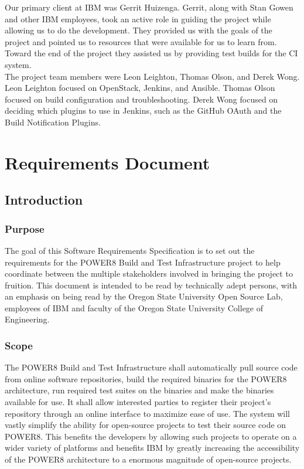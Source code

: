 \documentclass[10pt,letterpaper,onecolumn,draftclsnofoot]{IEEEtran}
\begin{document}
Our primary client at IBM was Gerrit Huizenga. Gerrit, along with Stan Gowen and
other IBM employees, took an active role in guiding the project while allowing us
to do the development. They provided us with the goals of the project and pointed
us to resources that were available for us to learn from. Toward the end of the
project they assisted us by providing test builds for the CI system. \\

The project team members were Leon Leighton, Thomas Olson, and Derek Wong. Leon
Leighton focused on OpenStack, Jenkins, and Ansible. Thomas Olson focused on build configuration and troubleshooting.
Derek Wong focused on deciding which plugins to use in Jenkins, such as the GitHub OAuth and the Build Notification Plugins. 
\clearpage
\section{Requirements Document}
\subsection{Introduction}
\subsubsection{Purpose}
The goal of this Software Requirements Specification is to set out the requirements for the POWER8 Build and Test Infrastructure project to help coordinate between the multiple stakeholders involved in bringing the project to fruition. This document is intended to be read by technically adept persons, with an emphasis on being read by the Oregon State University Open Source Lab, employees of IBM and faculty of the Oregon State University College of Engineering.
\subsubsection{Scope}
The POWER8 Build and Test Infrastructure shall automatically pull source code from online software repositories, build the required binaries for the POWER8 architecture, run required test suites on the binaries and make the binaries available for use. It shall allow interested parties to register their project's repository through an online interface to maximize ease of use. The system will vastly simplify the ability for open-source projects to test their source code on POWER8. This benefits the developers by allowing such projects to operate on a wider variety of platforms and benefits IBM by greatly increasing the accessibility of the POWER8 architecture to a enormous magnitude of open-source projects.
\end{document}
